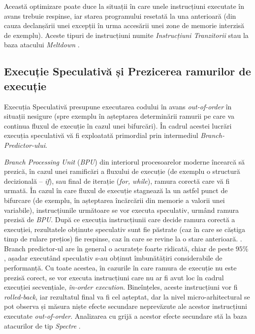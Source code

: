 Această optimizare poate duce la situații în care unele instrucțiuni executate în
avans trebuie respinse, iar starea programului resetată la una anterioară (din
cauza declanșării unei excepții în urma accesării unei zone de memorie interzisă
de exemplu). Aceste tipuri de instrucțiuni numite \emph{Instrucțiuni
Tranzitorii} stau la baza atacului \emph{Meltdown} \cite{meltdown2018}.

\subsection{Execuție Speculativă și Prezicerea ramurilor de execuție}
\label{sec:branch_prediction}

Execuția Speculativă presupune executarea codului în avans \emph{out-of-order}
în situații nesigure (spre exemplu în așteptarea determinării ramurii 
pe care va continua fluxul de execuție în cazul unei bifurcări). În cadrul
acestei lucrări execuția speculativă vă fi exploatată primordial prin intermediul 
\emph{Branch-Predictor-ului}.

\emph{Branch Processing Unit} (\emph{BPU}) din interiorul procesoarelor moderne
încearcă să prezică, în cazul unei ramificări a fluxului de execuție (de
exemplu o structură decizională -- \emph{if}), sau final de iterație
(\emph{for, while}), ramura corectă care vă fi urmată. În cazul în care fluxul
de execuție stagnează la un astfel punct de bifurcare (de exemplu, în
așteptarea încărcării din memorie a valorii unei variabile), instrucțiunile
următoare se vor executa speculativ, urmând ramura prezisă de \emph{BPU}. După
ce execuția instrucțiunii care decide ramura corectă a execuției, rezultatele
obținute speculativ sunt fie păstrate (caz în care se căștiga timp de rulare
prețios) fie respinse, caz în care se revine la o stare anterioară.
\cite{spectre2019}. \\

Branch predictor-ul are în general o acuratețe foarte ridicată, chiar de peste
$95\%$ \cite{what_is_speculative_execution}, așadar executând speculativ s-au
obținut îmbunătățiri considerabile de performanță. Cu toate acestea, în
cazurile în care ramura de execuție nu este prezisă corect, se vor executa
instrucțiuni care nu ar fi avut loc în cadrul execuției secvențiale,
\emph{în-order execution}. Bineînțeles, aceste instrucțiuni vor fi
\emph{rolled-back}, iar rezultatul final va fi cel așteptat, dar la nivel
micro-arhitectural se pot observa și măsura niște efecte secundare neprevăzute
ale acestor instrucțiuni executate \emph{out-of-order}. Analizarea cu grijă a
acestor efecte secundare stă la baza atacurilor de tip \emph{Spectre}
\cite{spectre2019}.

